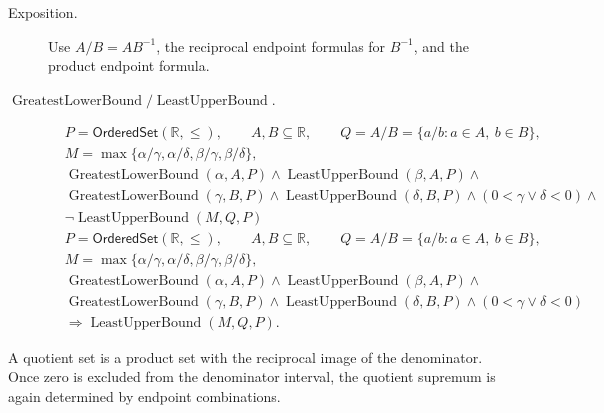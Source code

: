 \begin{remark*}
\begin{description}
  \item[Exposition.]
Use $A/B=A B^{-1}$, the reciprocal endpoint formulas for $B^{-1}$, and the
product endpoint formula.


  \item[\(\operatorname{GreatestLowerBound} / \operatorname{LeastUpperBound}.\)]

\[
\begin{aligned}
&P=\mathsf{OrderedSet}(\mathbb{R},\leq),\qquad
A,B\subseteq\mathbb{R},\qquad Q=A/B=\{a/b:a\in A,\ b\in B\},\\
&M=\max\{\alpha/\gamma,\alpha/\delta,\beta/\gamma,\beta/\delta\},\\
&\operatorname{GreatestLowerBound}(\alpha,A,P)\land
\operatorname{LeastUpperBound}(\beta,A,P)\land\\
&\operatorname{GreatestLowerBound}(\gamma,B,P)\land
\operatorname{LeastUpperBound}(\delta,B,P)\land
(0<\gamma\lor\delta<0)\land\\
&\neg\operatorname{LeastUpperBound}(M,Q,P)
\end{aligned}
\]
\[
\begin{aligned}
&P=\mathsf{OrderedSet}(\mathbb{R},\leq),\qquad
A,B\subseteq\mathbb{R},\qquad Q=A/B=\{a/b:a\in A,\ b\in B\},\\
&M=\max\{\alpha/\gamma,\alpha/\delta,\beta/\gamma,\beta/\delta\},\\
&\operatorname{GreatestLowerBound}(\alpha,A,P)\land
\operatorname{LeastUpperBound}(\beta,A,P)\land\\
&\operatorname{GreatestLowerBound}(\gamma,B,P)\land
\operatorname{LeastUpperBound}(\delta,B,P)\land
(0<\gamma\lor\delta<0)\\
&\Longrightarrow \operatorname{LeastUpperBound}(M,Q,P).
\end{aligned}
\]
\end{description}
\end{remark*}

\begin{remark*}[Interpretation]
A quotient set is a product set with the reciprocal image of the denominator.
Once zero is excluded from the denominator interval, the quotient supremum is
again determined by endpoint combinations.
\end{remark*}

